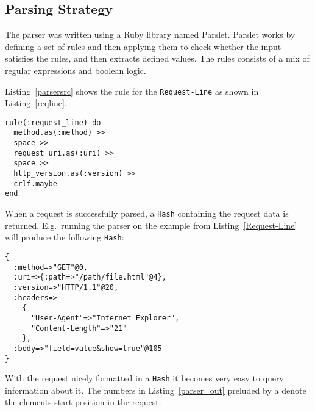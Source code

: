 \subsection{Parsing Strategy}
The parser was written using a Ruby library named Parslet. Parslet works by
defining a set of rules and then applying them to check whether the input
satisfies the rules, and then extracts defined values. The rules consists of a
mix of regular expressions and boolean logic.

Listing~\ref{parsersrc} shows the rule for the \texttt{Request-Line} as shown
in Listing~\ref{reqline}.

\bigskip
\begin{lstlisting}[label=parsersrc]
rule(:request_line) do 
  method.as(:method) >> 
  space >> 
  request_uri.as(:uri) >> 
  space >> 
  http_version.as(:version) >> 
  crlf.maybe 
end
\end{lstlisting}

When a request is successfully parsed, a \texttt{Hash} containing the request
data is returned. E.g.\ running the parser on the example from
Listing~\ref{Request-Line} will produce the following \texttt{Hash}:

\bigskip
\begin{lstlisting}[label=parser_out,caption=Example \texttt{Parser} output]
{
  :method=>"GET"@0,
  :uri=>{:path=>"/path/file.html"@4},
  :version=>"HTTP/1.1"@20,
  :headers=>
    {
      "User-Agent"=>"Internet Explorer",
      "Content-Length"=>"21"
    },
  :body=>"field=value&show=true"@105
}
\end{lstlisting}

With the request nicely formatted in a \texttt{Hash} it becomes very easy to
query information about it. The numbers in Listing~\ref{parser_out} preluded
by a \@ denote the elements start position in the request.
